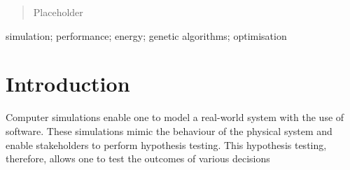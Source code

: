 \documentclass[10pt, conference, compsocconf]{IEEEtran}
\begin{document}




\maketitle

\begin{abstract}
Placeholder

\end{abstract}

\begin{IEEEkeywords}
simulation; performance; energy; genetic algorithms; optimisation

\end{IEEEkeywords}


%
\IEEEpeerreviewmaketitle


\section{Introduction}

Computer simulations enable one to model a real-world system with the use of software. These simulations mimic the behaviour of the physical system and enable stakeholders to perform hypothesis testing. This hypothesis testing, therefore, allows one to test the outcomes of various decisions
\end{document}
